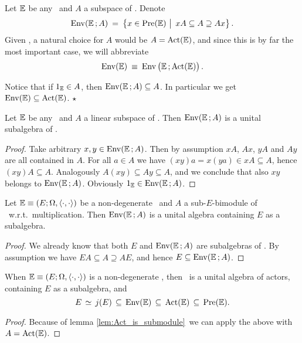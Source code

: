 \begin{defn*} \label{def:env}
  Let $\mathbb{E}$ be any \context\ and $A$ a subspace of \PreE\@. Denote
  $$  {\rm Env}(\EE\,;A)
         \:=\:  \left\{x\in\PreE  \,\left|\vertM\right.\,
                       xA \subseteq A \supseteq Ax \right\}.  $$
  Given \EE, a natural choice for $A$ would be $A=\mbox{\rm Act}(\mathbb{E})$,
  and since this is by far the most important case, we will abbreviate
  $$  \EnvE \: \equiv \: {\rm Env}\left(\EE\, ;\ActE \vertM\right).  $$
\end{defn*}

\begin{remark} \label{rem:Env_in_A}   \rm
  Notice that if $1_{\mathbb{E}} \in A$, then ${\rm Env}(\mathbb{E}\, ;A) \subseteq A$.
  In particular we get $\mbox{\rm Env}(\mathbb{E}) \subseteq \mbox{\rm Act}(\mathbb{E})$.
  \hfill $\star$
\end{remark}


\begin{lemma}
  Let\/ $\mathbb{E}$ be any \context\ and $A$ a linear subspace of\/ \PreE\@.
  Then ${\rm Env}(\mathbb{E}\, ;A)$ is a unital subalgebra of\/ \PreE.
\end{lemma}

\begin{proof}
  Take arbitrary $x,y \in {\rm Env}(\mathbb{E}\, ;A)$.
  Then by assumption $xA$, $Ax$, $yA$ and $Ay$ are all contained in $A$.
  For all $a\in A$ we have $(xy)a = x(ya) \in xA \subseteq A$,
  hence $(xy)A \subseteq A$\@. Analogously $A(xy)\subseteq Ay \subseteq A$,
  and we conclude that also $xy$ belongs to ${\rm Env}(\mathbb{E}\,;A)$\@.
  Obviously $1_{\mathbb{E}} \in {\rm Env}(\mathbb{E}\,;A)$.
\end{proof}


\begin{prop}  \label{prop:Env_is_an_algebra}
  Let\/ $\mathbb{E}\equiv (E; \Omega, \langle\cdot, \cdot\rangle)$ be a non-degenerate \context\ and
  $A$ a sub-$E$-bimodule of\/ \PreE\ w.r.t.\ multiplication.
  Then\/ ${\rm Env}(\mathbb{E}\,;A)$ is a unital algebra containing $E$ as a subalgebra.
\end{prop}
\begin{proof}
  We already know that both $E$ and  ${\rm Env}(\mathbb{E}\,;A)$ are subalgebras of \PreE\@.
  By assumption we have $EA \subseteq A \supseteq AE$,
  and hence $E \subseteq {\rm Env}(\mathbb{E}\,;A)$.
\end{proof}


\begin{cor} \label{cor:Env_is_an_algebra}
   When\/ $\mathbb{E}\equiv (E; \Omega, \langle\cdot, \cdot\rangle)$ is a non-degenerate \context, then\/ \EnvE\ is a unital
   algebra of actors, containing $E$ as a subalgebra, and
   $$ E \,\simeq\, j(E)\,\subseteq\, \mbox{\rm Env}(\mathbb{E}) \,\subseteq\, \mbox{\rm Act}(\mathbb{E}) \,\subseteq\, \mbox{\rm Pre}(\mathbb{E}). $$
\end{cor}
\begin{proof}
  Because of lemma \ref{lem:Act_is_submodule}\ we can apply the above with $A=\mbox{\rm Act}(\mathbb{E})$.
\end{proof}



